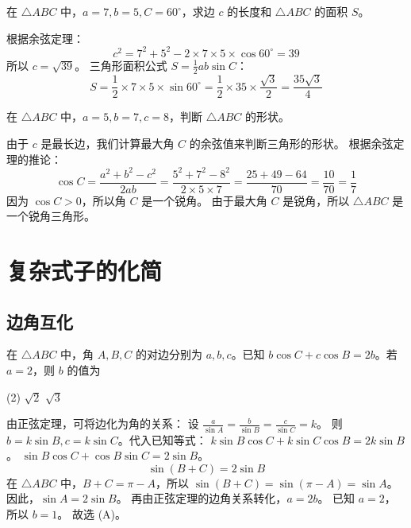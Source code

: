 \begin{example}
    在 $\triangle ABC$ 中，$a=7, b=5, C=60^\circ$，求边 $c$ 的长度和 $\triangle ABC$ 的面积 $S$。
\end{example}
\begin{solution}
    根据余弦定理：
    $$
        c^2 = 7^2 + 5^2 - 2 \times 7 \times 5 \times \cos 60^\circ = 39
    $$
    所以 $c = \sqrt{39}$。
    三角形面积公式 $S = \frac{1}{2}ab \sin C$：
    $$
        S = \frac{1}{2} \times 7 \times 5 \times \sin 60^\circ = \frac{1}{2} \times 35 \times \frac{\sqrt{3}}{2} = \frac{35\sqrt{3}}{4}
    $$
\end{solution}
\vspace{2em}

\begin{example}
    在 $\triangle ABC$ 中，$a=5, b=7, c=8$，判断 $\triangle ABC$ 的形状。
\end{example}
\begin{solution}
    由于 $c$ 是最长边，我们计算最大角 $C$ 的余弦值来判断三角形的形状。
    根据余弦定理的推论：
    $$
        \cos C = \frac{a^2 + b^2 - c^2}{2ab} = \frac{5^2 + 7^2 - 8^2}{2 \times 5 \times 7} = \frac{25 + 49 - 64}{70} = \frac{10}{70} = \frac{1}{7}
    $$
    因为 $\cos C > 0$，所以角 $C$ 是一个锐角。
    由于最大角 $C$ 是锐角，所以 $\triangle ABC$ 是一个锐角三角形。
\end{solution}
\vspace{2em}

\section{复杂式子的化简}
\subsection{边角互化}
\begin{example}
    在 $\triangle ABC$ 中，角 $A,B,C$ 的对边分别为 $a,b,c$。已知 $b\cos C + c\cos B = 2b$。若 $a=2$，则 $b$ 的值为
    \begin{tasks}(2)
        \task $\sqrt{2}$
        \task $\sqrt{3}$
    \end{tasks}
\end{example}
\begin{solution}
    由正弦定理，可将边化为角的关系：
    设 $\frac{a}{\sin A} = \frac{b}{\sin B} = \frac{c}{\sin C} = k$。
    则 $b=k\sin B, c=k\sin C$。代入已知等式：
    $k\sin B \cos C + k\sin C \cos B = 2k\sin B$。
    $\sin B \cos C + \cos B \sin C = 2\sin B$。
    $$
        \sin(B+C) = 2\sin B
    $$
    在 $\triangle ABC$ 中，$B+C = \pi - A$，所以 $\sin(B+C) = \sin(\pi - A) = \sin A$。
    因此，$\sin A = 2\sin B$。
    再由正弦定理的边角关系转化，$a = 2b$。
    已知 $a=2$，所以 $b=1$。
    故选 (A)。
\end{solution}


